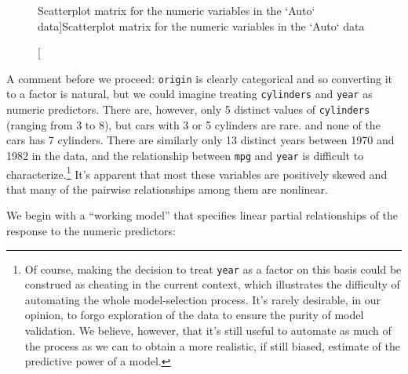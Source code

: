 \documentclass[
]{jss}
\begin{document}
\begin{CodeChunk}
\begin{figure}
{}

\caption[Scatterplot matrix for the numeric variables in the `Auto` data]{Scatterplot matrix for the numeric variables in the `Auto` data}\label{fig:Auto-explore}
\end{figure}
\end{CodeChunk}

A comment before we proceed: \texttt{origin} is clearly categorical and
so converting it to a factor is natural, but we could imagine treating
\texttt{cylinders} and \texttt{year} as numeric predictors. There are,
however, only 5 distinct values of \texttt{cylinders} (ranging from 3 to
8), but cars with 3 or 5 cylinders are rare. and none of the cars has 7
cylinders. There are similarly only 13 distinct years between 1970 and
1982 in the data, and the relationship between \texttt{mpg} and
\texttt{year} is difficult to characterize.\footnote{Of course, making
  the decision to treat \texttt{year} as a factor on this basis could be
  construed as cheating in the current context, which illustrates the
  difficulty of automating the whole model-selection process. It's
  rarely desirable, in our opinion, to forgo exploration of the data to
  ensure the purity of model validation. We believe, however, that it's
  still useful to automate as much of the process as we can to obtain a
  more realistic, if still biased, estimate of the predictive power of a
  model.} It's apparent that most these variables are positively skewed
and that many of the pairwise relationships among them are nonlinear.

We begin with a ``working model'' that specifies linear partial
relationships of the response to the numeric predictors:
\end{document}
